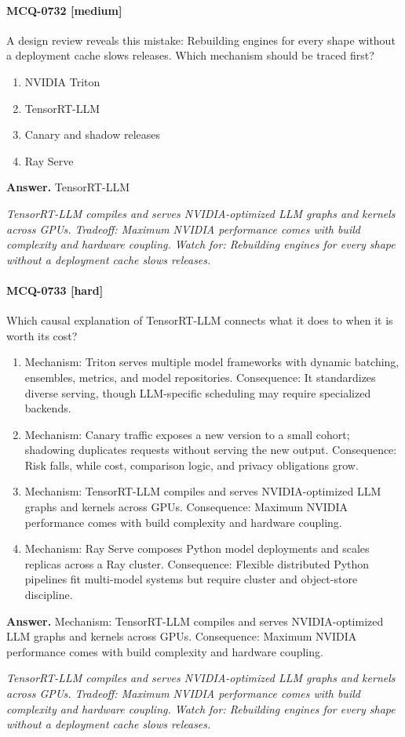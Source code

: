 \paragraph{MCQ-0732 [medium]} A design review reveals this mistake: Rebuilding engines for every shape without a deployment cache slows releases. Which mechanism should be traced first?
\begin{enumerate}[label=\Alph*.]
\item NVIDIA Triton
\item TensorRT-LLM
\item Canary and shadow releases
\item Ray Serve
\end{enumerate}
\noindent\textbf{Answer.} TensorRT-LLM
\par\textit{TensorRT-LLM compiles and serves NVIDIA-optimized LLM graphs and kernels across GPUs. Tradeoff: Maximum NVIDIA performance comes with build complexity and hardware coupling. Watch for: Rebuilding engines for every shape without a deployment cache slows releases.}
\paragraph{MCQ-0733 [hard]} Which causal explanation of TensorRT-LLM connects what it does to when it is worth its cost?
\begin{enumerate}[label=\Alph*.]
\item Mechanism: Triton serves multiple model frameworks with dynamic batching, ensembles, metrics, and model repositories. Consequence: It standardizes diverse serving, though LLM-specific scheduling may require specialized backends.
\item Mechanism: Canary traffic exposes a new version to a small cohort; shadowing duplicates requests without serving the new output. Consequence: Risk falls, while cost, comparison logic, and privacy obligations grow.
\item Mechanism: TensorRT-LLM compiles and serves NVIDIA-optimized LLM graphs and kernels across GPUs. Consequence: Maximum NVIDIA performance comes with build complexity and hardware coupling.
\item Mechanism: Ray Serve composes Python model deployments and scales replicas across a Ray cluster. Consequence: Flexible distributed Python pipelines fit multi-model systems but require cluster and object-store discipline.
\end{enumerate}
\noindent\textbf{Answer.} Mechanism: TensorRT-LLM compiles and serves NVIDIA-optimized LLM graphs and kernels across GPUs. Consequence: Maximum NVIDIA performance comes with build complexity and hardware coupling.
\par\textit{TensorRT-LLM compiles and serves NVIDIA-optimized LLM graphs and kernels across GPUs. Tradeoff: Maximum NVIDIA performance comes with build complexity and hardware coupling. Watch for: Rebuilding engines for every shape without a deployment cache slows releases.}
